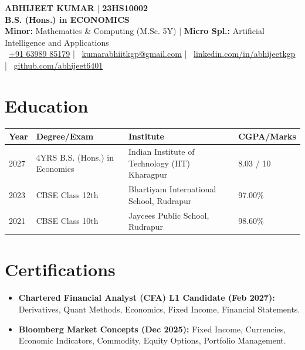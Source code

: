 \documentclass[10pt, a4paper]{article}
\begin{document}
\begin{center}
  {\LARGE \textbf{ABHIJEET KUMAR}} \quad | \quad \textbf{23HS10002} \\[3pt]
  \textbf{B.S. (Hons.) in ECONOMICS} \\[2pt]
  \small \textbf{Minor:} Mathematics \& Computing (M.Sc. 5Y) \quad | \quad \textbf{Micro Spl.:} Artificial Intelligence and Applications \\[3pt]
  \small
  \faPhone\ \href{tel:+916398985179}{+91 63989 85179} \quad | \quad
  \faEnvelope\ \href{mailto:kumarabhiitkgp@gmail.com}{kumarabhiitkgp@gmail.com} \quad | \quad
  \faLinkedin\ \href{https://linkedin.com/in/abhijeetkgp}{linkedin.com/in/abhijeetkgp} \quad | \quad
  \faGithub\ \href{https://github.com/abhijeet6401}{github.com/abhijeet6401}
\end{center}

\vspace{-4pt}

\section{Education}
\begin{center}
\small
\begin{tabular*}{\textwidth}{@{\extracolsep{\fill}}llll}
\hline
\textbf{Year} & \textbf{Degree/Exam} & \textbf{Institute} & \textbf{CGPA/Marks} \\
\hline
2027 & 4YRS B.S. (Hons.) in Economics & Indian Institute of Technology (IIT) Kharagpur & 8.03 / 10 \\
2023 & CBSE Class 12th & Bhartiyam International School, Rudrapur & 97.00\% \\
2021 & CBSE Class 10th & Jaycees Public School, Rudrapur & 98.60\% \\
\hline
\end{tabular*}
\end{center}

\vspace{-2pt}

\section{Certifications}
\begin{itemize}[leftmargin=1.2em, itemsep=0.5pt, parsep=0pt, topsep=1pt]
  \small
  \item \textbf{Chartered Financial Analyst (CFA) L1 Candidate (Feb 2027):} Derivatives, Quant Methods, Economics, Fixed Income, Financial Statements.
  \item \textbf{Bloomberg Market Concepts (Dec 2025):} Fixed Income, Currencies, Economic Indicators, Commodity, Equity Options, Portfolio Management.
\end{itemize}
\end{document}
